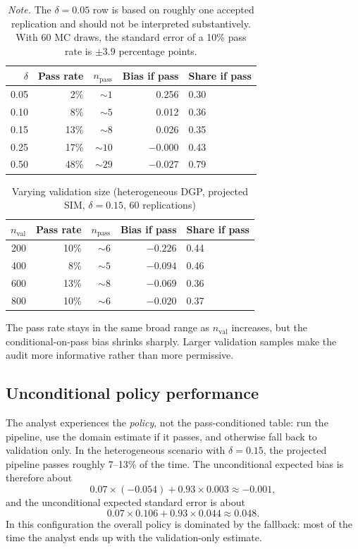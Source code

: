 \documentclass[11pt]{article}
\newcommand{\1}{\mathbf{1}}
\begin{document}
\begin{table}[htbp]
\centering
\small
\caption{Varying the distortion budget $\delta$ (heterogeneous DGP, projected SIM, 60 replications)}
\label{tab:delta}
\begin{tabular}{rrrrl}
\toprule
$\delta$ & Pass rate & $n_{\mathrm{pass}}$ & Bias if pass & Share if pass \\
\midrule
0.05 & 2\%  & $\sim 1$  & 0.256 & 0.30 \\
0.10 & 8\%  & $\sim 5$  & 0.012 & 0.36 \\
0.15 & 13\% & $\sim 8$  & 0.026 & 0.35 \\
0.25 & 17\% & $\sim 10$ & $-0.000$ & 0.43 \\
0.50 & 48\% & $\sim 29$ & $-0.027$ & 0.79 \\
\bottomrule
\end{tabular}
\caption*{\emph{Note.} The $\delta=0.05$ row is based on roughly one accepted replication and should not be interpreted substantively. With 60 MC draws, the standard error of a 10\% pass rate is $\pm 3.9$ percentage points.}
\end{table}

\begin{table}[htbp]
\centering
\small
\caption{Varying validation size (heterogeneous DGP, projected SIM, $\delta=0.15$, 60 replications)}
\label{tab:nval}
\begin{tabular}{rrrrl}
\toprule
$n_{\mathrm{val}}$ & Pass rate & $n_{\mathrm{pass}}$ & Bias if pass & Share if pass \\
\midrule
200 & 10\% & $\sim 6$ & $-0.226$ & 0.44 \\
400 & 8\%  & $\sim 5$ & $-0.094$ & 0.46 \\
600 & 13\% & $\sim 8$ & $-0.069$ & 0.36 \\
800 & 10\% & $\sim 6$ & $-0.020$ & 0.37 \\
\bottomrule
\end{tabular}
\end{table}

The pass rate stays in the same broad range as $n_{\mathrm{val}}$ increases, but the conditional-on-pass bias shrinks sharply. Larger validation samples make the audit more informative rather than more permissive.

\subsection{Unconditional policy performance}

The analyst experiences the \emph{policy}, not the pass-conditioned table: run the pipeline, use the domain estimate if it passes, and otherwise fall back to validation only. In the heterogeneous scenario with $\delta=0.15$, the projected pipeline passes roughly 7--13\% of the time. The unconditional expected bias is therefore about
\[
0.07\times (-0.054) + 0.93\times 0.003 \approx -0.001,
\]
and the unconditional expected standard error is about
\[
0.07\times 0.106 + 0.93\times 0.044 \approx 0.048.
\]
In this configuration the overall policy is dominated by the fallback: most of the time the analyst ends up with the validation-only estimate.
\end{document}
